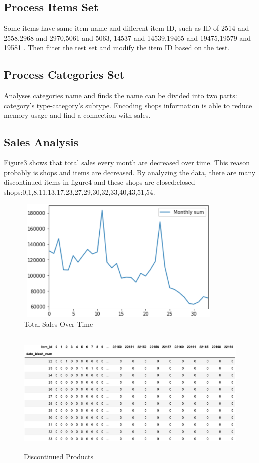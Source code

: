 \subsection{Process Items Set} Some items have same item name and different item ID, such as ID of 2514 and 2558,2968 and 2970,5061 and 5063, 14537 and 14539,19465 and 19475,19579 and 19581
. Then fliter the test set and modify the item ID based on the test.

\subsection{Process Categories Set}  Analyses categories name and finds the name can be divided into two parts: category's type-category's subtype. Encoding shops information is able to reduce memory usage and find a connection with sales.

\subsection{Sales Analysis}	Figure3 shows that total sales every month are decreased over time. This reason probably is shops and items are decreased. By analyzing the data, there are many discontinued items in figure4 and these shops are closed:closed shops:0,1,8,11,13,17,23,27,29,30,32,33,40,43,51,54.
	\begin{figure}[htb]
	\centering
	\includegraphics[width=10cm, height=6cm]{figures/sum.eps}
	\caption{Total Sales Over Time
	}\label{straddltimeScale}
\end{figure}
\begin{figure}[htb]
	\centering
	\includegraphics[width=12cm, height=6cm]{figures/stopitems.eps}
	\caption{Discontinued Products
	}\label{straddltimeScale}
\end{figure}
